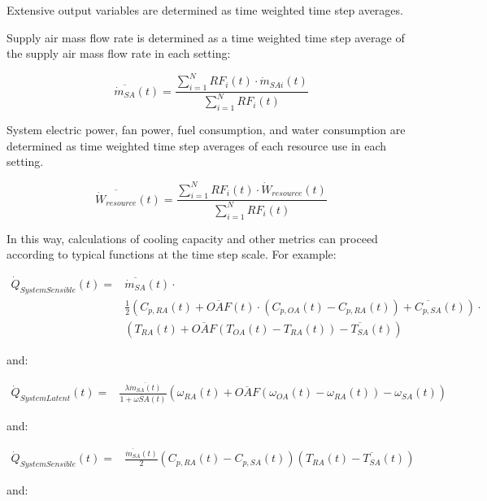Extensive output variables are determined as time weighted time step averages.

Supply air mass flow rate is determined as a time weighted time step average of the supply air mass flow rate in each setting:

\begin{equation}
	\overline{\dot{m}_{SA}}(t) = \frac{\sum_{i=1}^{N}RF_{i}(t) \cdot \dot{m}_{SAi}(t)} {\sum_{i=1}^{N}RF_{i}(t)}
\end{equation}

System electric power, fan power, fuel consumption, and water consumption are determined as time weighted time step averages of each resource use in each setting.

\begin{equation}
	\overline{\dot{W}_{resource}}(t) = \frac{\sum_{i=1}^{N}RF_{i}(t) \cdot \dot{W}_{resource}(t)} {\sum_{i=1}^{N}RF_{i}(t)}
\end{equation}

In this way, calculations of cooling capacity and other metrics can proceed according to typical functions at the time step scale. For example:

\begin{align}
	\dot{Q}_{SystemSensible}(t) = & \overline{\dot{m}_{SA}}(t) \cdot \nonumber \\
	                              & \frac{1}{2}\left(C_{p,RA}(t) + \overline{OAF}(t) \cdot \left( C_{p,OA}(t)-C_{p,RA}(t) \right) + \overline{C_{p,SA}}(t) \right) \cdot \nonumber \\
	                              & \left( T_{RA}(t) + \overline{OAF}\left( T_{OA}(t) - T_{RA}(t) \right) - \overline{T_{SA}}(t) \right)
\end{align}

and:

\begin{align}
	\dot{Q}_{SystemLatent}(t) = & \frac{\lambda\overline{\dot{m}_{SA}(t)}}{1+\overline{\omega{SA}}(t)}\left(\omega_{RA}(t)+\overline{OAF}\left(\omega_{OA}(t)-\omega_{RA}(t)\right)-\omega_{SA}(t)\right)
\end{align}

and:

\begin{align}
	\dot{Q}_{SystemSensible}(t) = & \frac{\overline{\dot{m}_{SA}}(t)}{2}\left(C_{p,RA}(t)-C_{p,SA}(t)\right)\left(T_{RA}(t)-\overline{T_{SA}}(t)\right)
\end{align}

and:

